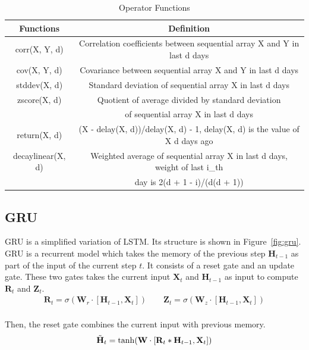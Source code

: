 \documentclass{article}
\begin{document}
\begin{table}[htb]
  \centering\small
  \caption{Operator Functions}
  \label{tab:op_fun}
\begin{tabular}{cc}
    \toprule
    Functions & Definition \\
    \midrule
    corr(X, Y, d) & Correlation coefficients between sequential array X and Y in last d days \\
    cov(X, Y, d) & Covariance between sequential array X and Y in last d days \\
    stddev(X, d) & Standard deviation of sequential array X in last d days \\
    zscore(X, d) & Quotient of average divided by standard deviation \\ & of sequential array X in last d days \\
    return(X, d) & (X - delay(X, d))/delay(X, d) - 1, delay(X, d) is the value of X d days ago  \\
    decaylinear(X, d) & Weighted average of sequential array X in last d days, weight of last i_{th} \\
    & day is 2(d + 1 - i)/(d(d + 1)) \\
    \bottomrule
  \end{tabular}
\end{table}



\subsection{GRU}
\hspace{16}GRU is a simplified variation of LSTM. Its structure is shown in Figure~\ref{fig:gru}. GRU is a recurrent model which takes the memory of the previous step $\textbf{H}_{t-1}$ as part of the input of the current step $t$. It consists of a reset gate and an update gate. These two gates takes the current input $\textbf{X}_t$ and $\textbf{H}_{t-1}$ as input to compute $\textbf{R}_t$ and $\textbf{Z}_t$.
\begin{equation*}
    \begin{aligned}
    \textbf{R}_t = \sigma(\textbf{W}_r\cdot [\textbf{H}_{t-1}, \textbf{X}_t]) \quad\quad
    \textbf{Z}_t = \sigma(\textbf{W}_z\cdot [\textbf{H}_{t-1}, \textbf{X}_t]) \\
    \end{aligned}
\end{equation*}

\hspace{16}Then, the reset gate combines the current input with previous memory.
\begin{equation*}
    \begin{aligned}
    \Tilde{\textbf{H}}_t = \tanh (\textbf{W}\cdot [\textbf{R}_t * \textbf{H}_{t-1}, \textbf{X}_t])
    \end{aligned}
\end{equation*}
\end{document}
